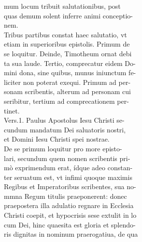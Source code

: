 \documentclass{article}
\begin{document}
\begin{pages}
                mum locum tribuit salutationibus, post \\
                \textbf{}quas demum solent inferre animi conceptio- \\
                nem. \\
                Tribus partibus constat haec salutatio, vt \\
                etiam in superioribus epistolis. Primum de \\
                se loquitur. Deinde, Timotheum ornat debi \\
                ta sua laude. Tertio, comprecatur eidem Do- \\
                mini dona, sine quibus, munus iniunctum fe- \\
                liciter non poterat exequi. Primum ad per- \\
                sonam scribentis, alterum ad personam cui \\
                seribitur, tertium ad comprecationem per- \\
                tinet. \\
                Vers.1. Paulus Apostolus Iesu Christi se- \\
                cundum mandatum Dei saluatoris nostri, \\
                et Domini Iesu Christi spei nostrae. \\
                De se primum loquitur pro more episto- \\
                lari, secundum quem nomen scribentis pri- \\
                mò exprimendum erat, ídque adeo constan- \\
                ter seruatum est, vt infimi quoque maximis \\
                Regibus et Imperatoribus scribentes, sua no- \\
                mmna Regum titulis praeponerent: donec \\
                praepostera illa adulatio regnare in Ecclesia \\
                Christi coepit, et hypocrisis sese extulit in lo \\
                cum Dei, hinc quaesita est gloria et splendo- \\
                ris dignitas in nominum praerogatiua, de qua \\

\end{pages}
\end{document}
